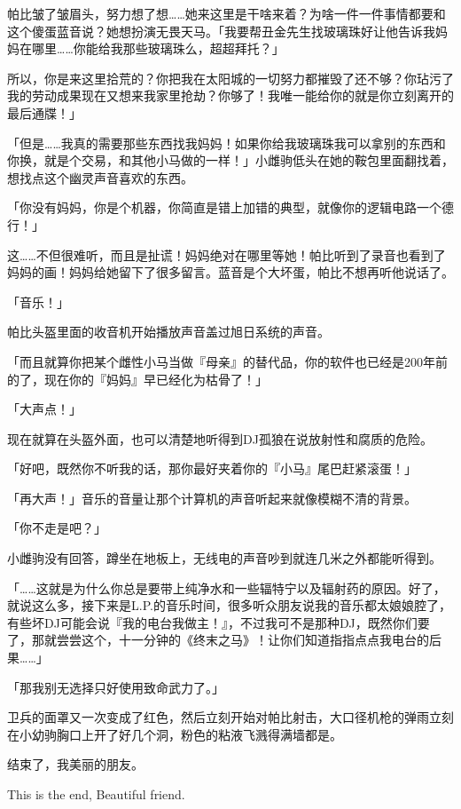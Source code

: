 帕比皱了皱眉头，努力想了想……她来这里是干啥来着？为啥一件一件事情都要和这个傻蛋蓝音说？她想扮演无畏天马。「我要帮丑金先生找玻璃珠好让他告诉我妈妈在哪里……你能给我那些玻璃珠么，超超拜托？」

所以，你是来这里拾荒的？你把我在太阳城的一切努力都摧毁了还不够？你玷污了我的劳动成果现在又想来我家里抢劫？你够了！我唯一能给你的就是你立刻离开的最后通牒！」

「但是……我真的需要那些东西找我妈妈！如果你给我玻璃珠我可以拿别的东西和你换，就是个交易，和其他小马做的一样！」小雌驹低头在她的鞍包里面翻找着，想找点这个幽灵声音喜欢的东西。

「你没有妈妈，你是个机器，你简直是错上加错的典型，就像你的逻辑电路一个德行！」

这……不但很难听，而且是扯谎！妈妈绝对在哪里等她！帕比听到了录音也看到了妈妈的画！妈妈给她留下了很多留言。蓝音是个大坏蛋，帕比不想再听他说话了。

「音乐！」

帕比头盔里面的收音机开始播放声音盖过旭日系统的声音。

「而且就算你把某个雌性小马当做『母亲』的替代品，你的软件也已经是200年前的了，现在你的『妈妈』早已经化为枯骨了！」

「大声点！」

现在就算在头盔外面，也可以清楚地听得到DJ孤狼在说放射性和腐质的危险。

「好吧，既然你不听我的话，那你最好夹着你的『小马』尾巴赶紧滚蛋！」

「再大声！」音乐的音量让那个计算机的声音听起来就像模糊不清的背景。

「你不走是吧？」

小雌驹没有回答，蹲坐在地板上，无线电的声音吵到就连几米之外都能听得到。

「{\rt ……这就是为什么你总是要带上纯净水和一些辐特宁以及辐射药的原因。好了，就说这么多，接下来是L.P.的音乐时间，很多听众朋友说我的音乐都太娘娘腔了，有些坏DJ可能会说『我的电台我做主！』，不过我可不是那种DJ，既然你们要了，那就尝尝这个，十一分钟的《终末之马》！让你们知道指指点点我电台的后果……}」

「那我别无选择只好使用致命武力了。」

卫兵的面罩又一次变成了红色，然后立刻开始对帕比射击，大口径机枪的弹雨立刻在小幼驹胸口上开了好几个洞，粉色的粘液飞溅得满墙都是。

\begin{song}
结束了，我美丽的朋友。

This is the end, Beautiful friend.
\end{song}


